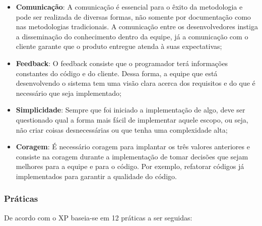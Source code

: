 \begin{itemize}
  \item \textbf{Comunicação}: A comunicação é essencial para o êxito da metodologia e pode ser realizada de diversas formas, não somente por documentação como nas metodologias tradicionais. A comunicação entre os desenvolvedores instiga a disseminação do conhecimento dentro da equipe, já a comunicação com o cliente garante que o produto entregue atenda à suas expectativas;
  \item \textbf{Feedback}: O feedback consiste que o programador terá informações constantes do código e do cliente.  Dessa forma, a equipe que está desenvolvendo o sistema tem uma visão clara acerca dos requisitos e do que é necessário que seja implementado;
  \item \textbf{Simplicidade}: Sempre que foi iniciado a implementação de algo, deve ser questionado qual a forma mais fácil de implementar aquele escopo, ou seja, não criar coisas desnecessárias ou que tenha uma complexidade alta;
  \item \textbf{Coragem}: É necessário coragem para implantar os três valores anteriores e consiste na coragem durante a implementação de tomar decisões que sejam melhores para a equipe e para o código. Por exemplo, refatorar códigos já implementados para garantir a qualidade do código.
\end{itemize}

\subsubsection{Práticas}

De acordo com \cite{beck} o XP baseia-se em 12 práticas a ser seguidas:

